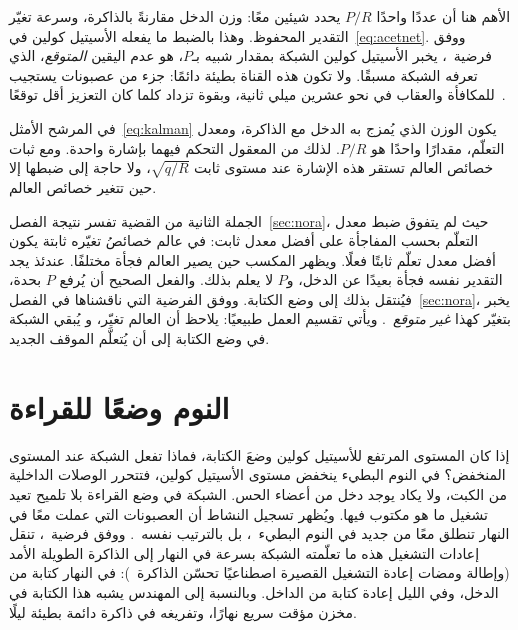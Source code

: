 الأهم هنا أن عددًا واحدًا $P/R$ يحدد شيئين معًا: وزن الدخل مقارنةً بالذاكرة، وسرعة تغيّر التقدير المحفوظ. وهذا بالضبط ما يفعله الأسيتيل كولين في~\eqref{eq:acetnet}. ووفق فرضية~\cite{YuDayan2005}، يخبر الأسيتيل كولين الشبكة بمقدار شبيه بـ$P$، هو عدم اليقين \emph{المتوقع}، الذي تعرفه الشبكة مسبقًا. ولا تكون هذه القناة بطيئة دائمًا: جزء من عصبونات  يستجيب للمكافأة والعقاب في نحو عشرين ميلي ثانية، وبقوة تزداد كلما كان التعزيز أقل توقعًا~\cite{Hangya2015}.

\begin{keyblock}
\begin{proposition}
\label{prop:kalman}
في المرشح الأمثل~\eqref{eq:kalman} يكون الوزن الذي يُمزج به الدخل مع الذاكرة، ومعدل التعلّم، مقدارًا واحدًا هو $P/R$. لذلك من المعقول التحكم فيهما بإشارة واحدة. ومع ثبات خصائص العالم تستقر هذه الإشارة عند مستوى ثابت $\sqrt{q/R}$، ولا حاجة إلى ضبطها إلا حين تتغير خصائص العالم.
\end{proposition}
\end{keyblock}

الجملة الثانية من القضية تفسر نتيجة الفصل~\ref{sec:nora}، حيث لم يتفوق ضبط معدل التعلّم بحسب المفاجأة على أفضل معدل ثابت: في عالم خصائصُ تغيّره ثابتة يكون أفضل معدل تعلّم ثابتًا فعلًا. ويظهر المكسب حين يصير العالم فجأة مختلفًا. عندئذ يجد التقدير نفسه فجأة بعيدًا عن الدخل، و$P$ لا يعلم بذلك. والفعل الصحيح أن يُرفع $P$ بحدة، فيُنتقل بذلك إلى وضع الكتابة. ووفق الفرضية التي ناقشناها في الفصل~\ref{sec:nora}، يخبر  بتغيّر كهذا \emph{غير متوقع}~\cite{YuDayan2005}. ويأتي تقسيم العمل طبيعيًا:  يلاحظ أن العالم تغيّر، و يُبقي الشبكة في وضع الكتابة إلى أن يُتعلَّم الموقف الجديد.

\section{النوم وضعًا للقراءة}

إذا كان المستوى المرتفع للأسيتيل كولين وضعَ الكتابة، فماذا تفعل الشبكة عند المستوى المنخفض؟ في النوم البطيء ينخفض مستوى الأسيتيل كولين، فتتحرر الوصلات الداخلية من الكبت، ولا يكاد يوجد دخل من أعضاء الحس. الشبكة في وضع القراءة بلا تلميح تعيد تشغيل ما هو مكتوب فيها. ويُظهر تسجيل النشاط أن العصبونات التي عملت معًا في النهار تنطلق معًا من جديد في النوم البطيء~\cite{WilsonMcNaughton1994}، بل بالترتيب نفسه~\cite{Skaggs1996}. ووفق فرضية~\cite{Hasselmo1999}، تنقل إعادات التشغيل هذه ما تعلّمته الشبكة بسرعة في النهار إلى الذاكرة الطويلة الأمد (وإطالة ومضات إعادة التشغيل القصيرة اصطناعيًا تحسّن الذاكرة~\cite{FernandezRuiz2019}): في النهار كتابة من الدخل، وفي الليل إعادة كتابة من الداخل. وبالنسبة إلى المهندس يشبه هذا الكتابة في مخزن مؤقت سريع نهارًا، وتفريغه في ذاكرة دائمة بطيئة ليلًا.

